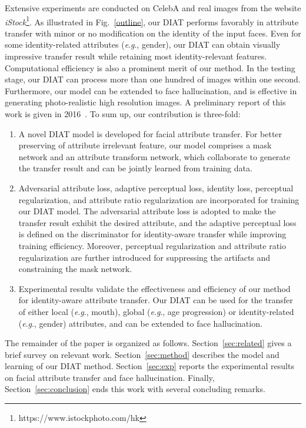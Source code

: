 \documentclass[journal]{IEEEtran}
\newcommand{\eg}{\textit{e}.\textit{g}.}
\begin{document}
Extensive experiments are conducted on CelebA and real images from the website \emph{iStock}\footnote{https://www.istockphoto.com/hk}.
As illustrated in Fig.~\ref{outline}, our DIAT performs favorably in attribute transfer with minor or no modification on the identity of the input faces.
Even for some identity-related attributes (\eg, gender), our DIAT can obtain visually impressive transfer result while retaining most identity-relevant features.
Computational efficiency is also a prominent merit of our method. In the testing stage, our DIAT can process more than one hundred of images within one second.
Furthermore, our model can be extended to face hallucination, and is effective in generating photo-realistic high resolution images.
A preliminary report of this work is given in 2016~\cite{li2016deep}. To sum up, our contribution is three-fold:
\begin{enumerate}
\item A novel DIAT model is developed for facial attribute transfer.
For better preserving of attribute irrelevant feature, our model comprises a mask network and an attribute transform network, which collaborate to generate the transfer result and can be jointly learned from training data.
\item Adversarial attribute loss, adaptive perceptual loss, identity loss, perceptual regularization, and attribute ratio regularization are incorporated for training our DIAT model.
The adversarial attribute loss is adopted to make the transfer result exhibit the desired attribute, and the adaptive perceptual loss is defined on the discriminator for identity-aware transfer while improving training efficiency.
Moreover, perceptual regularization and attribute ratio regularization are further introduced for suppressing the artifacts and constraining the mask network.
\item Experimental results validate the effectiveness and efficiency of our method for identity-aware attribute transfer.
Our DIAT can be used for the transfer of either local (\eg, mouth), global (\eg, age progression) or identity-related (\eg, gender) attributes, and can be extended to face hallucination.
\end{enumerate}


The remainder of the paper is organized as follows. Section~\ref{sec:related} gives a brief survey on relevant work. Section~\ref{sec:method} describes the model and learning of our DIAT method. Section~\ref{sec:exp} reports the experimental results on facial attribute transfer and face hallucination. Finally, Section~\ref{sec:conclusion} ends this work with several concluding remarks.
\end{document}

